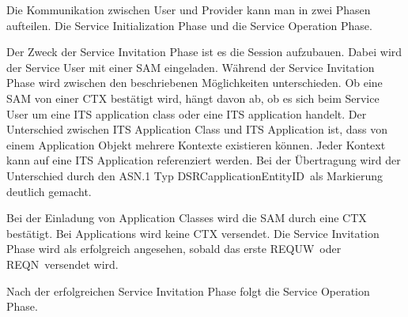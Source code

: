 Die Kommunikation zwischen User und Provider kann man in zwei Phasen aufteilen. Die Service Initialization Phase und die Service Operation Phase.

Der Zweck der Service Invitation Phase ist es die Session aufzubauen. Dabei wird der Service User mit einer \ac{SAM} eingeladen. Während der Service Invitation Phase wird zwischen den beschriebenen Möglichkeiten unterschieden. Ob eine \ac{SAM} von einer \ac{CTX} bestätigt wird, hängt davon ab, ob es sich beim Service User um eine \ac{ITS} application class oder eine \ac{ITS} application handelt. Der Unterschied zwischen \ac{ITS} Application Class und \ac{ITS} Application ist, dass von einem Application Objekt mehrere Kontexte existieren können. Jeder Kontext kann auf eine \ac{ITS} Application referenziert werden. Bei der Übertragung wird der Unterschied durch  den \ac{ASN.1} Typ \glqq DSRCapplicationEntityID\grqq~als Markierung deutlich gemacht. 

Bei der Einladung von Application Classes wird die \ac{SAM} durch eine \ac{CTX} bestätigt. Bei Applications wird keine \ac{CTX} versendet. Die Service Invitation Phase wird als erfolgreich angesehen, sobald das erste \glqq REQUW\grqq~oder \glqq REQN\grqq~versendet wird. 

Nach der erfolgreichen Service Invitation Phase folgt die Service Operation Phase.

